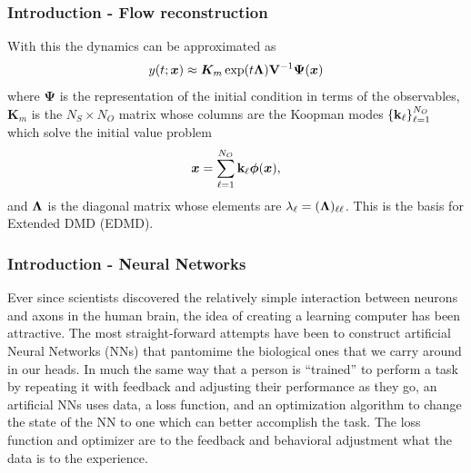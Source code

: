 \documentclass[11pt,aspectratio=169]{beamer}
\newcommand{\bracks}[1]{\left\{#1\right\}}
\begin{document}
    \begin{frame}
        \frametitle{Introduction - Flow reconstruction}
        With this the dynamics can be approximated as 
        \begin{equation}
            y(t;\boldsymbol{x}) \approx \boldsymbol{K}_m\exp(t{\bf\Lambda}){\bf V}^{-1}\boldsymbol{\Psi}(\boldsymbol{x}) 
        \end{equation}
        where $\boldsymbol{\Psi}$ is the representation of the initial condition in terms of the observables, 
        $\boldsymbol{K}_m$ is the $N_S \times N_O$ matrix whose columns are the Koopman modes 
        $\bracks{{\bf k}_\ell}_{\ell=1}^{N_O}$ which solve the initial value problem
        \begin{equation}
            \boldsymbol{x} = \sum_{\ell=1}^{N_O}{\bf k}_\ell\boldsymbol{\phi}(\boldsymbol{x}),
        \end{equation}
        and ${\bf \Lambda}$ is the diagonal matrix whose elements are $\lambda_\ell
        = ({\bf \Lambda})_{\ell\ell}$.
        This is the basis for Extended DMD (EDMD).
    \end{frame}

    \begin{frame}
        \frametitle{Introduction - Neural Networks}
        Ever since
        scientists discovered the relatively simple interaction between neurons and axons in 
        the human brain, the idea of creating a learning computer has been attractive.
        The most straight-forward attempts have been 
        to construct artificial Neural Networks (NNs) that pantomime the biological ones that we carry 
        around in our heads. In much the same 
        way that a person is ``trained'' to perform a task by repeating it with feedback and 
        adjusting their performance as they go, an artificial NNs uses data, a loss function, and 
        an optimization algorithm to change the state of the NN to one which can better accomplish 
        the task. The loss function and optimizer are to the feedback and behavioral adjustment 
        what the data is to the experience. 
    \end{frame}
\end{document}
